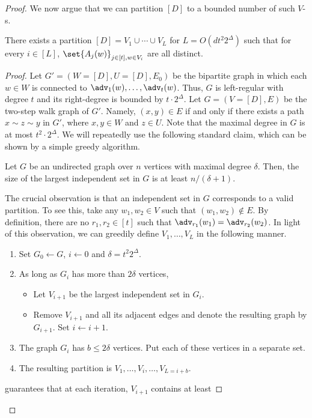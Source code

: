 \documentclass{toc}
\begin{document}
\begin{proof}
We now argue that we can partition $[D]$ to a bounded number of such $V$-s.
\begin{lemma}
There exists a partition $[D] = V_1 \cup \cdots \cup V_L$ for $L = O(dt^2  2^{\Delta})$
such that for every $i \in [L]$, $\set{A_{j}(w)}_{j \in [t],w \in V_i}$ are all distinct.
\end{lemma}
\begin{proof}
Let $G' = (W = [D],U = [D],E_0)$ be the bipartite graph in which each $w \in W$ is
connected to $\adv_{1}(w),\ldots,\adv_{t}(w)$. Thus, $G$ is left-regular with degree $t$
and its right-degree is bounded by $t \cdot 2^{\Delta}$. Let $G = (V = [D],E)$ be the
two-step walk graph of $G'$. Namely, $(x,y) \in E$ if and only if there exists a path
$x \sim z \sim y$ in $G'$, where $x,y \in W$ and $z \in U$. 
Note that the maximal degree in $G$ is at most $t^{2} \cdot 2^{\Delta}$.
We will repeatedly use
the following standard claim, which can be shown by a simple greedy algorithm.
\begin{claim}\label{claim:aux}
Let $G$ be an undirected graph over $n$ vertices with maximal degree $\delta$.
Then, the size of the largest independent set in $G$ is at least 
%
%
$n/(\delta+1)$.
%
%
%
\end{claim}
The crucial observation is that an independent set in $G$ corresponds to a valid partition.
To see this, take any $w_1,w_2 \in V$ such that $(w_1,w_2) \notin E$. By definition, there are no
$r_1,r_2 \in [t]$ such that $\adv_{r_1}(w_1) = \adv_{r_2}(w_2)$. In light of this observation,
we can greedily define $V_1,\ldots,V_{L}$ in the following manner.
\begin{enumerate}
\item	Set $G_0 \leftarrow G$, $i \leftarrow 0$ and $\delta = t^{2}2^{\Delta}$.
\item	As long as $G_i$ has more than $2\delta$ vertices,
\begin{itemize}
\item	Let $V_{i+1}$ be the largest independent set in $G_{i}$.
\item	Remove $V_{i+1}$ and all its adjacent edges and denote the resulting graph by $G_{i+1}$.
Set $i \leftarrow i+1$.
\end{itemize} 
\item	The graph $G_i$ has $b \le 2\delta$ vertices. Put each of these vertices in a separate
set.
\item	The resulting partition is $V_{1},\ldots,V_{i},\ldots,V_{L = i+b}$.
\end{enumerate}
 guarantees that at each iteration, $V_{i+1}$ contains at least 

\end{proof}
\end{proof}
\end{document}
